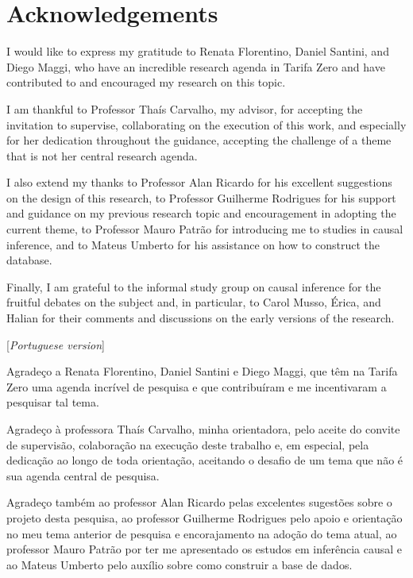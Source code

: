 \documentclass[12pt, a4paper, twoside]{article}
\numberwithin{equation}{subsection} %
\begin{document}
\newpage %

\doublespacing

\section*{Acknowledgements}

I would like to express my gratitude to Renata Florentino, Daniel Santini, and Diego Maggi, who have an incredible research agenda in Tarifa Zero and have contributed to and encouraged my research on this topic.

I am thankful to Professor Thaís Carvalho, my advisor, for accepting the invitation to supervise, collaborating on the execution of this work, and especially for her dedication throughout the guidance, accepting the challenge of a theme that is not her central research agenda.

I also extend my thanks to Professor Alan Ricardo for his excellent suggestions on the design of this research, to Professor Guilherme Rodrigues for his support and guidance on my previous research topic and encouragement in adopting the current theme, to Professor Mauro Patrão for introducing me to studies in causal inference, and to Mateus Umberto for his assistance on how to construct the database.

Finally, I am grateful to the informal study group on causal inference for the fruitful debates on the subject and, in particular, to Carol Musso, Érica, and Halian for their comments and discussions on the early versions of the research.


[\textit{Portuguese version}]

Agradeço a Renata Florentino, Daniel Santini e Diego Maggi, que têm na Tarifa Zero uma agenda incrível de pesquisa e que contribuíram e me incentivaram a pesquisar tal tema.

Agradeço à professora Thaís Carvalho, minha orientadora, pelo aceite do convite de supervisão, colaboração na execução deste trabalho e, em especial, pela dedicação ao longo de toda orientação, aceitando o desafio de um tema que não é sua agenda central de pesquisa.

Agradeço também ao professor Alan Ricardo pelas excelentes sugestões sobre o projeto desta pesquisa, ao professor Guilherme Rodrigues pelo apoio e orientação no meu tema anterior de pesquisa e encorajamento na adoção do tema atual, ao professor Mauro Patrão por ter me apresentado os estudos em inferência causal e ao Mateus Umberto pelo auxílio sobre como construir a base de dados.
\end{document}
